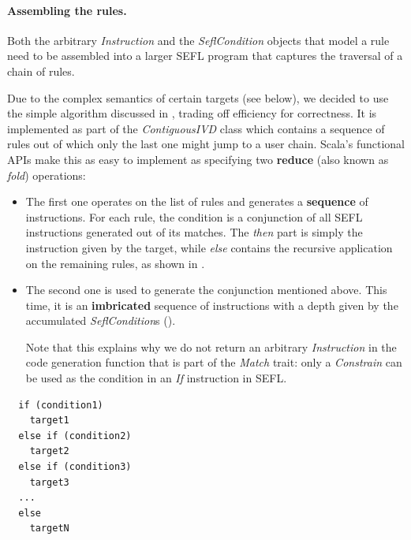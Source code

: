 {\paragraph{Assembling the rules.}
Both the arbitrary \emph{Instruction} and the \emph{SeflCondition} objects that
model a rule need to be assembled into a larger SEFL program that captures the
traversal of a chain of rules.

Due to the complex semantics of certain targets (see below), we decided to use
the simple algorithm discussed in ,
trading off efficiency for correctness.  It is implemented as part of the
\emph{ContiguousIVD} class which contains a sequence of rules out of which only
the last one might jump to a user chain.  Scala's functional APIs make this as
easy to implement as specifying two \textbf{reduce} (also known as \emph{fold})
operations:
\begin{itemize}
  \item The first one operates on the list of rules and generates a
    \textbf{sequence} of  instructions.  For each rule,
    the condition is a conjunction of all SEFL instructions generated out of
    its matches.  The \emph{then} part is simply the instruction given by the
    target, while \emph{else} contains the recursive application on the
    remaining rules, as shown in .

  \item The second one is used to generate the conjunction mentioned above.
    This time, it is an \textbf{imbricated} sequence of 
    instructions with a depth given by the accumulated \emph{SeflCondition}s
    ().

    Note that this explains why we do not return an arbitrary
    \emph{Instruction} in the code generation function that is part of the
    \emph{Match} trait: only a \emph{Constrain} can be used as the condition in
    an \emph{If} instruction in SEFL.
\end{itemize}

\begin{minipage}[t]{.45\textwidth}
  \begin{listing}[H]
    \lstset{numbers=none, frame=single}
    \begin{lstlisting}
  if (condition1)
    target1
  else if (condition2)
    target2
  else if (condition3)
    target3
  ...
  else
    targetN
    \end{lstlisting}


\end{listing}
\end{minipage}}
